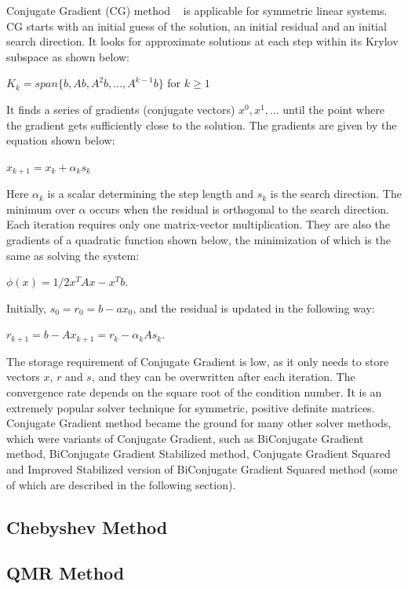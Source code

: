Conjugate Gradient (CG) method ~\cite{cg1,cg2,cg3} is applicable for symmetric linear systems. CG starts with an initial guess of the
solution, an initial residual and an initial search direction. It looks for approximate solutions at each step within its Krylov subspace as shown below: 
\begin{center}
${K}_{k} = span\{b,Ab,A^{2}b,\ldots,A^{k-1}b\}$ for $k \geq 1$
\end{center}
It finds a series of gradients (conjugate vectors) $x^{0}, x^{1}, \ldots$ until the point where the gradient gets sufficiently close to the solution. The gradients are given by the equation shown below: 
\begin{center}
$x_{k+1} = x_{k} + \alpha_k s_k$
\end{center}  
Here $\alpha_k$ is a scalar determining the step length and $ s_k$ is the search direction. The minimum over $\alpha $ occurs when the residual is orthogonal to the search direction. Each iteration requires only one matrix-vector multiplication. They are also the gradients of a quadratic function shown below, the minimization of which is the same as solving the system:
\begin{center}
$\phi(x) = 1/2 x^{T}Ax - x^{T} b $.
\end{center}
Initially, $s_0 = r_0 = b - ax_0$, and the residual is updated in the following way:
\begin{center}
$r_{k+1} = b - Ax_{k+1} = r_k - \alpha_k A s_k$.
\end{center}
The storage requirement of Conjugate Gradient is low, as it only needs to store vectors $x$, $r$ and $s$, and they can be overwritten after each iteration. The convergence rate depends on the square root of the condition number. It is an extremely popular solver technique for symmetric, positive definite matrices. Conjugate Gradient method became the ground for many other solver methods, which were variants of Conjugate Gradient, such as BiConjugate Gradient method, BiConjugate Gradient Stabilized method, Conjugate Gradient Squared and Improved Stabilized version of BiConjugate Gradient Squared method (some of which are described in the following section).



\subsection{Chebyshev Method}
\subsection{QMR Method}
